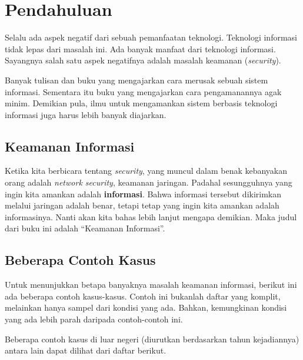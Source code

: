 \chapter{Pendahuluan}
Selalu ada aspek negatif dari sebuah pemanfaatan teknologi.
Teknologi informasi tidak lepas dari masalah ini.
Ada banyak manfaat dari teknologi informasi.
Sayangnya salah satu aspek negatifnya adalah masalah keamanan
({\em security}).

Banyak tulisan dan buku yang mengajarkan cara merusak sebuah
sistem informasi. Sementara itu buku yang mengajarkan cara
pengamanannya agak minim. Demikian pula, ilmu untuk mengamankan
sistem berbasis teknologi informasi juga harus lebih banyak
diajarkan.

\section{Keamanan Informasi}
Ketika kita berbicara tentang {\em security}, yang muncul dalam
benak kebanyakan orang adalah {\em network security}, keamanan jaringan.
Padahal sesungguhnya yang ingin kita amankan adalah \textbf{informasi}.
Bahwa informasi tersebut dikirimkan melalui jaringan adalah benar,
tetapi tetap yang ingin kita amankan adalah informasinya.
Nanti akan kita bahas lebih lanjut mengapa demikian.
Maka judul dari buku ini adalah ``Keamanan Informasi''.

\section{Beberapa Contoh Kasus}
Untuk menunjukkan betapa banyaknya masalah keamanan informasi,
berikut ini ada beberapa contoh kasus-kasus.
Contoh ini bukanlah daftar yang komplit, melainkan hanya sampel
dari kondisi yang ada. Bahkan, kemungkinan kondisi yang ada
lebih parah daripada contoh-contoh ini.

Beberapa contoh kasus di luar negeri (diurutkan berdasarkan
tahun kejadiannya) antara lain dapat dilihat dari daftar berikut.

